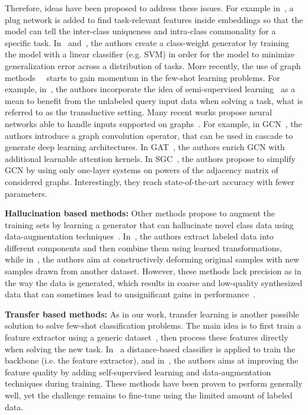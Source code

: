 \documentclass[a4paper,conference]{IEEEtran}
\begin{document}
Therefore, ideas have been proposed to address these issues. For example in~\cite{li2019finding}, a plug network is added to find task-relevant features inside embeddings so that the model can tell the inter-class uniqueness and intra-class commonality for a specific task. In~\cite{lee2019meta} and~\cite{bertinetto2018meta}, the authors create a class-weight generator by training the model with a linear classifier (e.g. SVM) in order for the model to minimize generalization error across a distribution of tasks. More recently, the use of graph methods~\cite{gori2005new}~\cite{koch2015siamese} starts to gain momentum in the few-shot learning problems. For example, in~\cite{garcia2017few,kim2019edge,gidaris2019generating,liu2018learning}, the authors incorporate the idea of semi-supervised learning~\cite{chapelle2009semi} as a mean to benefit from the unlabeled query input data when solving a task, what is referred to as the transductive setting. Many recent works propose neural networks able to handle inputs supported on graphs~\cite{hamilton2017representation}. For example, in GCN~\cite{kipf2016semi}, the authors introduce a graph convolution operator, that can be used in cascade to generate deep learning architectures. In GAT~\cite{velivckovic2017graph}, the authors enrich GCN with additional learnable attention kernels. In SGC~\cite{wu2019simplifying}, the authors propose to simplify GCN by using only one-layer systems on powers of the adjacency matrix of considered graphs. Interestingly, they reach state-of-the-art accuracy with fewer parameters.

\textbf{Hallucination based methods:} Other methods propose to augment the training sets by learning a generator that can hallucinate novel class data using data-augmentation techniques~\cite{chen2019closer}. In~\cite{zhang2019few}, the authors extract labeled data into different components and then combine them using learned transformations, while in~\cite{chen2019image}, the authors aim at constructively deforming original samples with new samples drawn from another dataset. However, these methods lack precision as in the way the data is generated, which results in coarse and low-quality synthesized data that can sometimes lead to unsignificant gains in performance~\cite{wang2019few}. 

\textbf{Transfer based methods:} As in our work, transfer learning is another possible solution to solve few-shot classification problems. The main idea is to first train a feature extractor using a generic dataset~\cite{torrey2010transfer,das2019two}, then process these features directly when solving the new task. In~\cite{chen2019closer} a distance-based classifier is applied to train the backbone (i.e. the feature extractor), and in~\cite{mangla2020charting}, the authors aims at improving the feature quality by adding self-supervised learning and data-augmentation techniques during training. These methods have been proven to perform generally well, yet the challenge remains to fine-tune using the limited amount of labeled data.
\end{document}
